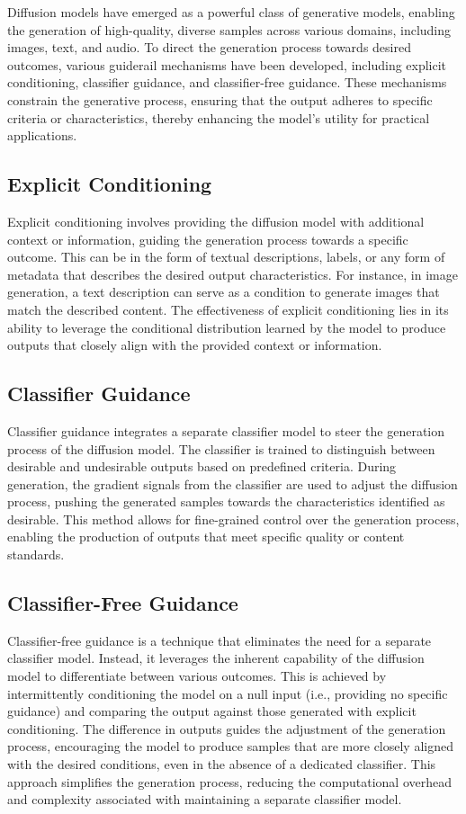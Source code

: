 Diffusion models have emerged as a powerful class of generative models, enabling the generation of high-quality, diverse samples across various domains, including images, text, and audio. To direct the generation process towards desired outcomes, various guiderail mechanisms have been developed, including explicit conditioning, classifier guidance, and classifier-free guidance. These mechanisms constrain the generative process, ensuring that the output adheres to specific criteria or characteristics, thereby enhancing the model's utility for practical applications.

\subsection{Explicit Conditioning}
Explicit conditioning involves providing the diffusion model with additional context or information, guiding the generation process towards a specific outcome. This can be in the form of textual descriptions, labels, or any form of metadata that describes the desired output characteristics. For instance, in image generation, a text description can serve as a condition to generate images that match the described content. The effectiveness of explicit conditioning lies in its ability to leverage the conditional distribution learned by the model to produce outputs that closely align with the provided context or information.

\subsection{Classifier Guidance}
Classifier guidance integrates a separate classifier model to steer the generation process of the diffusion model. The classifier is trained to distinguish between desirable and undesirable outputs based on predefined criteria. During generation, the gradient signals from the classifier are used to adjust the diffusion process, pushing the generated samples towards the characteristics identified as desirable. This method allows for fine-grained control over the generation process, enabling the production of outputs that meet specific quality or content standards.

\subsection{Classifier-Free Guidance}
Classifier-free guidance is a technique that eliminates the need for a separate classifier model. Instead, it leverages the inherent capability of the diffusion model to differentiate between various outcomes. This is achieved by intermittently conditioning the model on a null input (i.e., providing no specific guidance) and comparing the output against those generated with explicit conditioning. The difference in outputs guides the adjustment of the generation process, encouraging the model to produce samples that are more closely aligned with the desired conditions, even in the absence of a dedicated classifier. This approach simplifies the generation process, reducing the computational overhead and complexity associated with maintaining a separate classifier model. \cite*{CFG}

